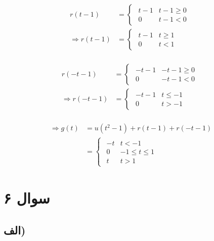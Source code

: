 \documentclass{article}
\begin{document}
	\begin{align*}
		r(t - 1) &=
		\begin{cases}
			\begin{matrix}
				t - 1 & t - 1 \ge 0 \\
				0 & t - 1 < 0
			\end{matrix}
		\end{cases} \\
		\Rightarrow
		r(t - 1) &=
		\begin{cases}
			\begin{matrix}
				t - 1 & t \ge 1 \\
				0 & t < 1
			\end{matrix}
		\end{cases} \\
	\end{align*}

	\begin{align*}
		r(-t - 1) &=
		\begin{cases}
			\begin{matrix}
				-t - 1 & -t - 1 \ge 0 \\
				0 & -t - 1 < 0
			\end{matrix}
		\end{cases} \\
		\Rightarrow
		r(-t - 1) &=
		\begin{cases}
			\begin{matrix}
				-t - 1 & t \le -1 \\
				0 & t > -1
			\end{matrix}
		\end{cases} \\
	\end{align*}

	\begin{align*}
		\Rightarrow
		g(t) &= u(t^2 - 1) + r(t - 1) + r(-t - 1) \\
		&=
		\begin{cases}
			\begin{matrix}
				-t & t < -1 \\
				0 & -1 \le t \le 1 \\
				t & t > 1
			\end{matrix}
		\end{cases}
	\end{align*}

	\section*{سوال ۶}
	\subsection*{الف)}
\end{document}
